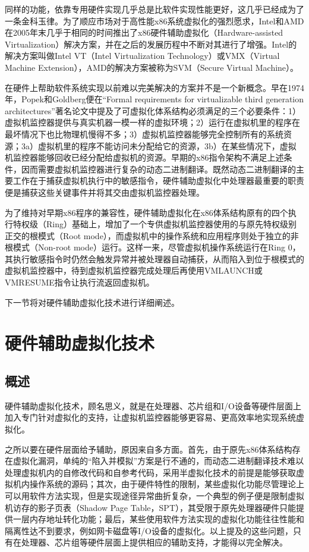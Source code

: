 同样的功能，依靠专用硬件实现几乎总是比软件实现性能更好，这几乎已经成为了一条金科玉律。为了顺应市场对于高性能x86系统虚拟化的强烈愿求，Intel和AMD在2005年末几乎于相同的时间推出了x86硬件辅助虚拟化（Hardware-assisted Virtualization）解决方案，并在之后的发展历程中不断对其进行了增强。Intel的解决方案叫做Intel VT（Intel Virtualization Technology）或VMX（Virtual Machine Extension），AMD的解决方案被称为SVM（Secure Virtual Machine）。

在硬件上帮助软件系统实现以前难以完美解决的方案并不是一个新概念。早在1974年，Popek和Goldberg便在``Formal requirements for virtualizable third generation architectures''著名论文中提及了可虚拟化体系结构必须满足的三个必要条件：1）虚拟机监控器提供与真实机器一模一样的虚拟环境；2）运行在虚拟机里的程序在最坏情况下也比物理机慢得不多；3）虚拟机监控器能够完全控制所有的系统资源；3a）虚拟机里的程序不能访问未分配给它的资源，3b）在某些情况下，虚拟机监控器能够回收已经分配给虚拟机的资源。早期的x86指令架构不满足上述条件，因而需要虚拟机监控器进行复杂的动态二进制翻译。既然动态二进制翻译的主要工作在于捕获虚拟机执行中的敏感指令，硬件辅助虚拟化中处理器最重要的职责便是捕获这些关键事件并将其交由虚拟机监控器处理。

为了维持对早期x86程序的兼容性，硬件辅助虚拟化在x86体系结构原有的四个执行特权级（Ring）基础上，增加了一个专供虚拟机监控器使用的与原先特权级别正交的根模式（Root mode），而虚拟机中的操作系统和应用程序则处于独立的非根模式（Non-root mode）运行。这样一来，尽管虚拟机操作系统运行在Ring 0，其执行敏感指令时仍然会触发异常并被处理器自动捕获，从而陷入到位于根模式的虚拟机监控器中，待到虚拟机监控器完成处理后再使用VMLAUNCH或VMRESUME指令让执行流返回虚拟机。

下一节将对硬件辅助虚拟化技术进行详细阐述。

\section{硬件辅助虚拟化技术}

\subsection{概述}

硬件辅助虚拟化技术，顾名思义，就是在处理器、芯片组和I/O设备等硬件层面上加入专门针对虚拟化的支持，让虚拟机监控器能够更容易、更高效率地实现系统虚拟化。

之所以要在硬件层面给予辅助，原因来自多方面。首先，由于原先x86体系结构存在虚拟化漏洞，单纯的``陷入并模拟''方案是行不通的，而动态二进制翻译技术难以处理虚拟机内的自修改代码和自参考代码，采用半虚拟化技术的前提是能够获取虚拟机内操作系统的源码；其次，由于硬件特性的限制，某些虚拟化功能尽管理论上可以用软件方法实现，但是实现途径异常曲折复杂，一个典型的例子便是限制虚拟机访存的影子页表（Shadow Page Table，SPT），其受限于原先处理器硬件只能提供一层内存地址转化功能；最后，某些使用软件方法实现的虚拟化功能往往性能和隔离性达不到要求，例如网卡磁盘等I/O设备的虚拟化。以上提及的这些问题，只有在处理器、芯片组等硬件层面上提供相应的辅助支持，才能得以完全解决。

